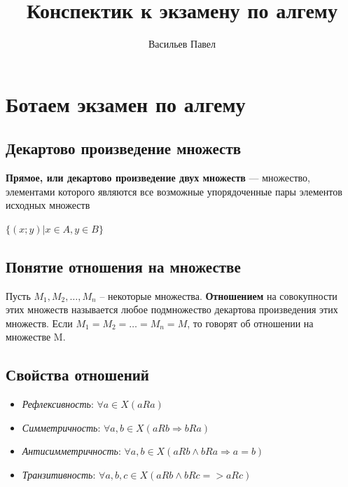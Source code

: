 \documentclass[a4paper]{article}
\title{Конспектик к экзамену по алгему}
\author{Васильев Павел}
\begin{document}
    \section*{Ботаем экзамен по алгему}

    \begin{center}
        \begin{Large}
        \end{Large}
    \end{center}

    \subsection*{Декартово произведение множеств}

    \begin{definit}
        \textbf{Прямое, или декартово произведение двух множеств} — множество, элементами которого являются все возможные упорядоченные пары элементов исходных множеств
    \end{definit}

    $\{ (x;y) | x \in A, y \in B \}$

    \subsection*{Понятие отношения на множестве
    }

    \begin{definit}
        Пусть $M_1, M_2, …, M_n$ – некоторые множества.
        \textbf{Отношением} на совокупности этих множеств называется любое подмножество
        декартова произведения этих множеств. Если $M_1 = M_2 = … = M_n = M$, то говорят об отношении на множестве M.
    \end{definit}

    \subsection*{Свойства отношений}

    \begin{itemize}
        \item \textit{Рефлексивность}: $\forall a \in X (a R a)$
        \item \textit{Симметричность}: $\forall a, b \in X (a R b \Rightarrow b R a)$
        \item \textit{Антисимметричность}: $\forall a, b \in X (a R b \land b R a \Rightarrow a = b)$
        \item \textit{Транзитивность}: $\forall a, b, c \in X (a R b \land b R c => a R c)$


    \end{itemize}
\end{document}
